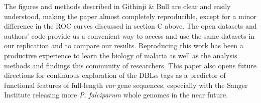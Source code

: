 \documentclass[10pt,twocolumn,superscriptaddress]{revtex4-1}
\newcommand{\var}{{\it var}\xspace}
\newcommand{\pf}{{\it P. falciparum}\xspace}
\newcommand{\dbla}{{DBL$\alpha$}\xspace}
\newcommand{\paper}{{Githinji \& Bull}\xspace}
\begin{document}
The figures and methods described in \paper are clear and easily understood, making the paper almost completely reproducible, except for a minor difference in the ROC curves discussed in section C above. The open datasets and authors' code provide us a convenient way to access and use the same datasets in our replication and to compare our results. Reproducing this work has been a productive experience to learn the biology of malaria as well as the analysis methods and findings this community of researchers. This paper also opens future directions for continuous exploration of the \dbla tags as a predictor of functional features of full-length \var gene sequences, especially with the Sanger Institute releasing more \pf whole genomes in the near future. 

%


\nocite{*}

 
\end{document}
